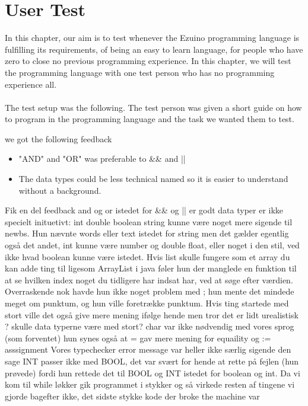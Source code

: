 \section{User Test}
In this chapter, our aim is to test whenever the Ezuino programming language is fulfilling its requirements, of being an easy to learn language, for people who have zero to close no previous programming experience. 
In this chapter, we will test the programming language with one test person who has no programming experience all.\\
\\
The test setup was the following. The test person was given a short guide on how to program in the programming language and the task we wanted them to test.

we got the following feedback
\begin{itemize}
    \item "AND" and "OR" was preferable to && and ||
    \item The data types could be less technical named so it is easier to understand without a background. 
\end{itemize}



Fik en del feedback
and og or istedet for && og || er godt
data typer er ikke specielt inituetivt: int double boolean string
kunne være noget mere sigende til newbs. Hun nævnte words eller text istedet for string men det gælder egentlig også det andet, int kunne være number og double float, eller noget i den stil, ved ikke hvad boolean kunne være istedet.
Hvis list skulle fungere som et array du kan adde ting til ligesom ArrayList i java føler hun der manglede en funktion til at se hvilken index noget du tidligere har indsat har, ved at søge efter værdien.
Overraskende nok havde hun ikke noget problem med ; hun mente det mindede meget om punktum, og hun ville foretrække punktum. 
Hvis ting startede med stort ville det også give mere mening ifølge hende men tror det er lidt urealistisk ? skulle data typerne være med stort?
char var ikke nødvendig med vores sprog (som forventet)
hun synes også at = gav mere mening for equaility og := asssignment
Vores typechecker error message var heller ikke særlig sigende den sage INT passer ikke med BOOL, det var svært for hende at rette på fejlen (hun prøvede) fordi hun rettede det til BOOL og INT istedet for boolean og int.
Da vi kom til while løkker gik programmet i stykker
og så virkede resten af tingene vi gjorde bagefter ikke, det sidste stykke kode der broke the machine var









